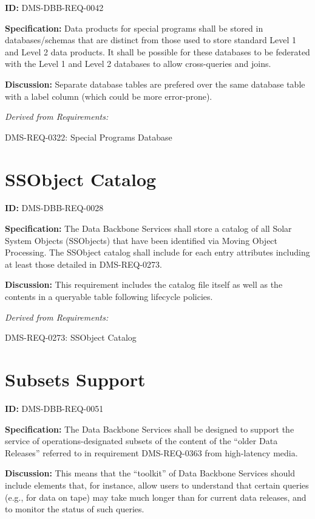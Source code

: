 \documentclass[SE,toc,lsstdraft]{lsstdoc}
\begin{document}
\label{DMS-DBB-REQ-0042}
\textbf{ID:} DMS-DBB-REQ-0042

\textbf{Specification:}
Data products for special programs shall be stored in databases/schemas that are distinct from those used to store standard Level 1 and Level 2 data products. It shall be possible for these databases to be federated with the Level 1 and Level 2 databases to allow cross-queries and joins.

\textbf{Discussion:}
Separate database tables are prefered over the same database table with a label column (which could be more error-prone).

\emph{Derived from Requirements:}

DMS-REQ-0322:
Special Programs Database \newline

\section{SSObject Catalog}

\label{DMS-DBB-REQ-0028}
\textbf{ID:} DMS-DBB-REQ-0028

\textbf{Specification:}
The Data Backbone Services shall store a catalog of all Solar System Objects (SSObjects) that have been identified via Moving Object Processing. The SSObject catalog shall include for each entry attributes including at least those detailed in DMS-REQ-0273.

\textbf{Discussion:}
This requirement includes the catalog file itself as well as the contents in a queryable table following lifecycle policies.

\emph{Derived from Requirements:}

DMS-REQ-0273:
SSObject Catalog \newline

\section{Subsets Support}

\label{DMS-DBB-REQ-0051}
\textbf{ID:} DMS-DBB-REQ-0051

\textbf{Specification:}
The Data Backbone Services shall be designed to support the service of operations-designated subsets of the content of the “older Data Releases” referred to in requirement DMS-REQ-0363 from high-latency media.

\textbf{Discussion:}
This means that the “toolkit” of Data Backbone Services should include elements that, for instance, allow users to understand that certain queries (e.g., for data on tape) may take much longer than for current data releases, and to monitor the status of such queries.
\end{document}
